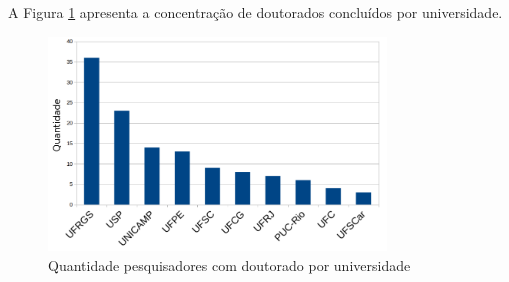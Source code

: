 A Figura \ref{fig:phd} apresenta a concentração de doutorados concluídos por universidade.

\begin{figure}[!ht]
	\centering
	\includegraphics[width=0.8\textwidth]{./imagens/phds.png}
	\caption{Quantidade pesquisadores com doutorado por universidade}
	\label{fig:phd}
\end{figure}